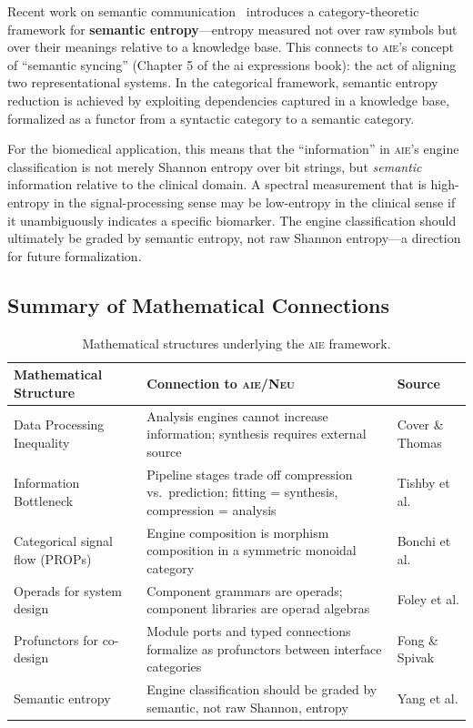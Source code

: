 \documentclass[11pt,letterpaper]{article}
\newcommand{\keyword}[1]{\textbf{\textcolor{accentpurple}{#1}}}
\newcommand{\neu}{\textsc{Neu}}
\newcommand{\aie}{\textsc{aie}}
\begin{document}
Recent work on semantic communication~\cite{yang2024} introduces a category-theoretic framework for \keyword{semantic entropy}---entropy measured not over raw symbols but over their meanings relative to a knowledge base. This connects to \aie{}'s concept of ``semantic syncing'' (Chapter 5 of the ai expressions book): the act of aligning two representational systems. In the categorical framework, semantic entropy reduction is achieved by exploiting dependencies captured in a knowledge base, formalized as a functor from a syntactic category to a semantic category.

For the biomedical application, this means that the ``information'' in \aie{}'s engine classification is not merely Shannon entropy over bit strings, but \textit{semantic} information relative to the clinical domain. A spectral measurement that is high-entropy in the signal-processing sense may be low-entropy in the clinical sense if it unambiguously indicates a specific biomarker. The engine classification should ultimately be graded by semantic entropy, not raw Shannon entropy---a direction for future formalization.

\subsection{Summary of Mathematical Connections}

\begin{table}[H]
\centering
\small
\begin{tabularx}{\textwidth}{lXl}
\toprule
\textbf{Mathematical Structure} & \textbf{Connection to \aie{}/\neu{}} & \textbf{Source} \\
\midrule
Data Processing Inequality & Analysis engines cannot increase information; synthesis requires external source & Cover \& Thomas \\
\addlinespace
Information Bottleneck & Pipeline stages trade off compression vs.\ prediction; fitting = synthesis, compression = analysis & Tishby et al. \\
\addlinespace
Categorical signal flow (PROPs) & Engine composition is morphism composition in a symmetric monoidal category & Bonchi et al. \\
\addlinespace
Operads for system design & Component grammars are operads; component libraries are operad algebras & Foley et al. \\
\addlinespace
Profunctors for co-design & Module ports and typed connections formalize as profunctors between interface categories & Fong \& Spivak \\
\addlinespace
Semantic entropy & Engine classification should be graded by semantic, not raw Shannon, entropy & Yang et al. \\
\bottomrule
\end{tabularx}
\caption{Mathematical structures underlying the \aie{} framework.}
\label{tab:math-connections}
\end{table}
\end{document}
